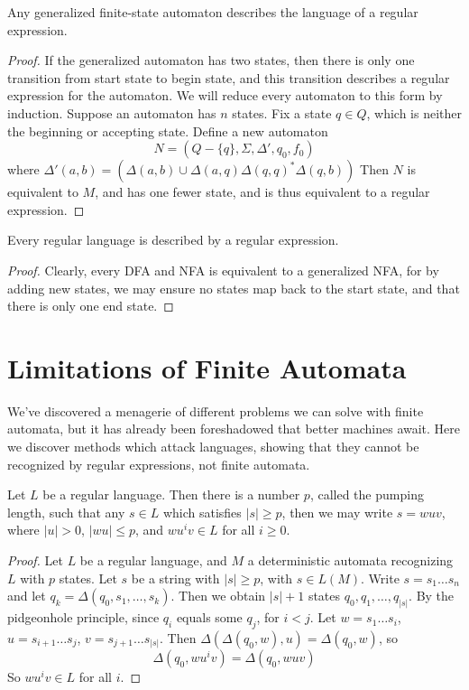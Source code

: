 \begin{theorem}
    Any generalized finite-state automaton describes the language of a regular expression.
\end{theorem}
\begin{proof}
    If the generalized automaton has two states, then there is only one transition from start state to begin state, and this transition describes a regular expression for the automaton. We will reduce every automaton to this form by induction. Suppose an automaton has $n$ states. Fix a state $q \in Q$, which is neither the beginning or accepting state. Define a new automaton
    \[ N = (Q - \{ q \}, \Sigma, \Delta', q_0, f_0) \]
    where $\Delta'(a,b) = (\Delta(a,b) \cup \Delta(a,q) \Delta(q,q)^* \Delta(q,b))$
    Then $N$ is equivalent to $M$, and has one fewer state, and is thus equivalent to a regular expression.
\end{proof}

\begin{corollary}
    Every regular language is described by a regular expression.
\end{corollary}
\begin{proof}
    Clearly, every DFA and NFA is equivalent to a generalized NFA, for by adding new states, we may ensure no states map back to the start state, and that there is only one end state.
\end{proof}


\section{Limitations of Finite Automata}

We've discovered a menagerie of different problems we can solve with finite automata, but it has already been foreshadowed that better machines await. Here we discover methods which attack languages, showing that they cannot be recognized by regular expressions, not finite automata.

\begin{theorem}
    Let $L$ be a regular language. Then there is a number $p$, called the pumping length, such that any $s \in L$ which satisfies $|s| \geq p$, then we may write $s = wuv$, where $|u| > 0$, $|wu| \leq p$, and $wu^iv \in L$ for all $i \geq 0$.
\end{theorem}
\begin{proof}
    Let $L$ be a regular language, and $M$ a deterministic automata recognizing $L$ with $p$ states. Let $s$ be a string with $|s| \geq p$, with $s \in L(M)$. Write $s = s_1 \dots s_n$ and let $q_k = \Delta(q_0, s_1, \dots, s_k)$. Then we obtain $|s| + 1$ states $q_0, q_1, \dots, q_{|s|}$. By the pidgeonhole principle, since $q_i$ equals some $q_j$, for $i < j$. Let $w = s_1 \dots s_i$, $u = s_{i+1} \dots s_j$, $v = s_{j+1} \dots s_{|s|}$. Then $\Delta(\Delta(q_0, w), u) = \Delta(q_0, w)$, so
    \[ \Delta(q_0, wu^iv) = \Delta(q_0, wuv) \]
    So $wu^iv \in L$ for all $i$.
\end{proof}

